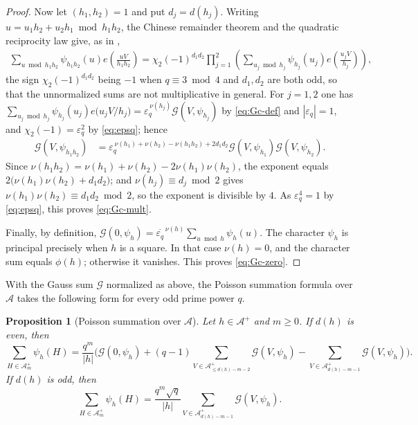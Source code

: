\documentclass[a4paper,reqno]{amsart}
\numberwithin{equation}{section}
\newtheorem{proposition}[theorem]{Proposition}
\theoremstyle{remark}
\theoremstyle{definition}
\newcommand{\A}{\mathcal{A}}
\newcommand{\Apn}[1]{\A^+_{#1}}
\newcommand{\Aple}[1]{\A^+_{\le #1}}
\newcommand{\epsq}{\varepsilon_q}
\newcommand{\Gc}{\mathcal{G}}
\begin{document}
\begin{proof}
Now let $(h_1,h_2)=1$ and put $d_j=d(h_j)$. Writing
$u=u_1h_2+u_2h_1\bmod{h_1h_2}$, the Chinese remainder theorem and the
quadratic reciprocity law give, as in \cite[Lemma~3.2]{Fl17-1},
\begin{align*}
\sum_{u\bmod h_1h_2}\psi_{h_1h_2}(u)e\!\left(\frac{uV}{h_1h_2}\right)
=\chi_2(-1)^{d_1d_2}
\prod_{j=1}^2\left(\sum_{u_j\bmod h_j}\psi_{h_j}(u_j)e\!\left(\frac{u_jV}{h_j}\right)\right),
\end{align*}
the sign $\chi_2(-1)^{d_1d_2}$ being $-1$ when $q\equiv3\bmod4$ and
$d_1,d_2$ are both odd, so that the unnormalized sums are not multiplicative
in general. For $j=1,2$ one has
$\sum_{u_j\bmod h_j}\psi_{h_j}(u_j)e\bigl(u_jV/h_j\bigr)
=\epsq^{\,\nu(h_j)}\Gc(V,\psi_{h_j})$ by \eqref{eq:Gc-def} and
$|\epsq|=1$, and $\chi_2(-1)=\epsq^2$ by \eqref{eq:epsq}; hence
\begin{align*}
\Gc(V,\psi_{h_1h_2})
&=\epsq^{\,\nu(h_1)+\nu(h_2)-\nu(h_1h_2)+2d_1d_2}
\Gc(V,\psi_{h_1})\Gc(V,\psi_{h_2}).
\end{align*}
Since $\nu(h_1h_2)=\nu(h_1)+\nu(h_2)-2\nu(h_1)\nu(h_2)$, the exponent equals
$2\bigl(\nu(h_1)\nu(h_2)+d_1d_2\bigr)$; and $\nu(h_j)\equiv d_j\bmod2$ gives
$\nu(h_1)\nu(h_2)\equiv d_1d_2\bmod2$, so the exponent is divisible by $4$.
As $\epsq^4=1$ by \eqref{eq:epsq}, this proves \eqref{eq:Gc-mult}.

Finally, by definition,
$\Gc(0,\psi_h)=\overline{\epsq}^{\,\nu(h)}\sum_{u\bmod h}\psi_h(u)$.
The character $\psi_h$ is principal precisely when $h$ is a square.
In that case $\nu(h)=0$, and the character sum equals $\phi(h)$; otherwise it vanishes.
This proves \eqref{eq:Gc-zero}.
\end{proof}

With the Gauss sum $\Gc$ normalized as above, the Poisson summation formula
over $\A$ takes the following form for every odd prime power $q$.

\begin{proposition}[Poisson summation over $\A$]
Let $h\in\A^+$ and $m\ge0$.
If $d(h)$ is even, then
\begin{equation}\label{eq:poisson_even}
\sum_{H\in\Apn{m}}\psi_h(H)
=\frac{q^m}{|h|}\Biggl(\Gc(0,\psi_h)+(q-1)\sum_{V\in\Aple{d(h)-m-2}}\Gc(V,\psi_h)-\sum_{V\in\Apn{d(h)-m-1}}\Gc(V,\psi_h)\Biggr).
\end{equation}
If $d(h)$ is odd, then
\begin{equation}\label{eq:poisson_odd}
\sum_{H\in\Apn{m}}\psi_h(H)
=\frac{q^m\sqrt q}{|h|}\sum_{V\in\Apn{d(h)-m-1}}\Gc(V,\psi_h).
\end{equation}
\end{proposition}
\end{document}
